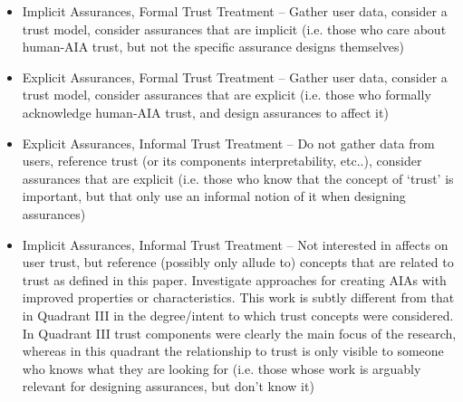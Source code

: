 \begin{itemize}
    \item Implicit Assurances, Formal Trust Treatment -- Gather user data, consider a trust model, consider assurances that are implicit (i.e. those who care about human-AIA trust, but not the specific assurance designs themselves)
    \item Explicit Assurances, Formal Trust Treatment -- Gather user data, consider a trust model, consider assurances that are explicit (i.e. those who formally acknowledge human-AIA trust, and design assurances to affect it)
    \item Explicit Assurances, Informal Trust Treatment -- Do not gather data from users, reference trust (or its components interpretability, etc..), consider assurances that are explicit (i.e. those who know that the concept of `trust' is important, but that only use an informal notion of it when designing assurances)
    \item Implicit Assurances, Informal Trust Treatment -- Not interested in affects on user trust, but reference (possibly only allude to) concepts that are related to trust as defined in this paper. Investigate approaches for creating AIAs with improved properties or characteristics. This work is subtly different from that in Quadrant III in the degree/intent to which trust concepts were considered. In Quadrant III trust components were clearly the main focus of the research, whereas in this quadrant the relationship to trust is only visible to someone who knows what they are looking for (i.e. those whose work is arguably relevant for designing assurances, but don't know it)
\end{itemize}

